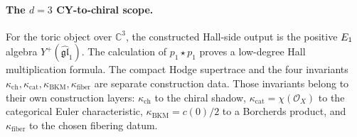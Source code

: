 \paragraph{The \texorpdfstring{$d=3$}{d=3} CY-to-chiral scope.}
For the toric object over $\mathbb{C}^3$, the constructed Hall-side
output is the positive $E_1$ algebra
$Y^+(\widehat{\mathfrak{gl}}_1)$. The calculation of
$p_1\star p_1$ proves a low-degree Hall multiplication formula. The
compact Hodge supertrace and the four invariants
$\kappa_{\mathrm{ch}},\kappa_{\mathrm{cat}},
\kappa_{\mathrm{BKM}},\kappa_{\mathrm{fiber}}$ are separate construction
data. Those invariants belong
to their own construction layers: $\kappa_{\mathrm{ch}}$ to the chiral
shadow, $\kappa_{\mathrm{cat}}=\chi(\mathcal{O}_X)$ to the categorical
Euler characteristic, $\kappa_{\mathrm{BKM}}=c(0)/2$ to a Borcherds
product, and $\kappa_{\mathrm{fiber}}$ to the chosen fibering datum.
